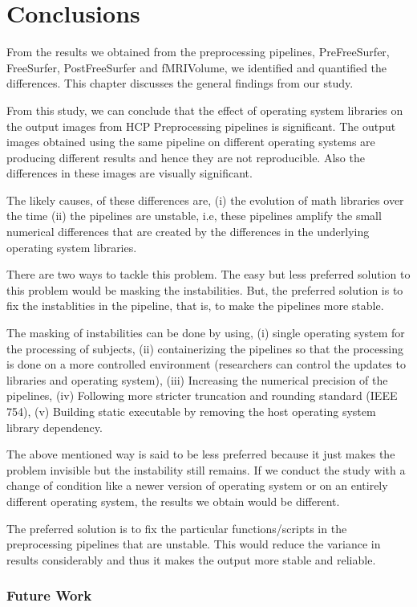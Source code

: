 \chapter{Conclusions}\label{conclusion}
From the results we obtained from the preprocessing pipelines, PreFreeSurfer, FreeSurfer, PostFreeSurfer and fMRIVolume, we identified and quantified the differences. This chapter discusses the general findings from our study.

From this study, we can conclude that the effect of operating system libraries on the output images from HCP Preprocessing pipelines is significant. The output images obtained using the same pipeline on different operating systems are producing different results and hence they are not reproducible. Also the differences in these images are visually significant.

The likely causes, of these differences are, (i) the evolution of math libraries over the time (ii) the pipelines are unstable, i.e, these pipelines amplify the small numerical differences that are created by the differences in the underlying operating system libraries.

There are two ways to tackle this problem. The easy but less preferred solution to this problem would be masking the instabilities. But, the preferred solution is to fix the instablities in the pipeline, that is, to make the pipelines more stable.

The masking of instabilities can be done by using, (i) single operating system for the processing of subjects, (ii) containerizing the pipelines so that the processing is done on a more controlled environment (researchers can control the updates to libraries and operating system), (iii) Increasing the numerical precision of the pipelines, (iv) Following more stricter truncation and rounding standard (IEEE 754), (v) Building static executable by removing the host operating system library dependency.

The above mentioned way is said to be less preferred because it just makes the problem invisible but the instability still remains. If we conduct the study with a change of condition like a newer version of operating system or on an entirely different operating system, the results we obtain would be different.

The preferred solution is to fix the particular functions/scripts in the preprocessing pipelines that are unstable. This would reduce the variance in results considerably and thus it makes the output more stable and reliable.


\subsection{Future Work}
